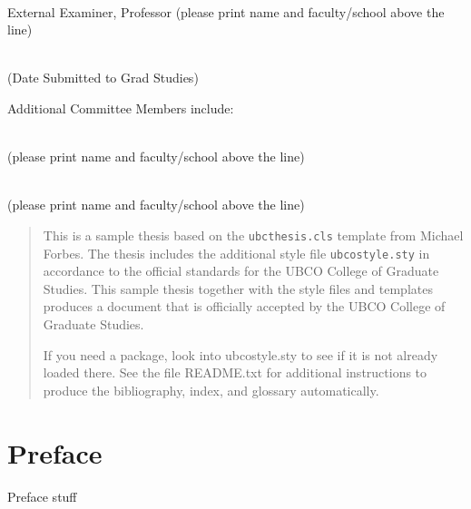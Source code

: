 \documentclass[msc,oneside]{ubcthesis}%
\begin{document}
\noindent\underline{\hspace{30em}} \\
External Examiner, Professor (please print name and faculty/school above the line)

\vspace{\linespace}

\noindent\underline{\hspace{30em}} \\
(Date Submitted to Grad Studies)

\vspace{\linespace}

Additional Committee Members include:

\vspace{\linespace}

\noindent\underline{\hspace{30em}} \\
(please print name and faculty/school above the line)

\vspace{\linespace}

\noindent\underline{\hspace{30em}} \\
(please print name and faculty/school above the line)

\normalsize

\newpage


\begin{abstract}                %
This is a sample thesis based on the \texttt{ubcthesis.cls} template
from Michael Forbes. The thesis includes the additional style file
\texttt{ubcostyle.sty} in accordance to the official standards for
the UBCO College of Graduate Studies.
This sample thesis together with the style files and templates
produces a document that is officially accepted by the UBCO College of Graduate Studies. 

If you need a package, look into ubcostyle.sty to see if it is not already loaded there. 
See the file README.txt for additional instructions to produce the bibliography, index, and glossary automatically.
\end{abstract}

\chapter{Preface}
Preface stuff
\end{document}
